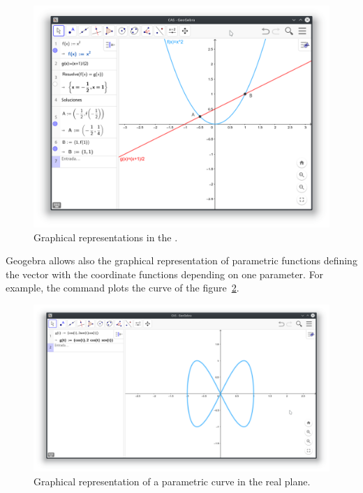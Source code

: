 \begin{figure}[h!]
\begin{center}
\includegraphics[width=\textwidth]{img/introduction/graphic-view}
\caption{Graphical representations in the .} \label{g:graphics-view}
\end{center}
\end{figure}

Geogebra allows also the graphical representation of parametric functions defining the vector with the coordinate functions depending on one parameter.
For example, the command  plots the curve of the figure~\ref{g:parametric-curve}.

\begin{figure}[h!]
\begin{center}
\includegraphics[width=\textwidth]{img/introduction/parametric-curve}
\caption{Graphical representation of a parametric curve in the real plane.} \label{g:parametric-curve}
\end{center}
\end{figure}

